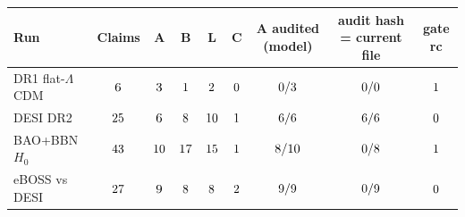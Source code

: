 \begin{tabular}{lcccccccc}
\toprule
Run & Claims & A & B & L & C & A audited (model) & audit hash = current file & gate rc \\
\midrule
DR1 flat-$\Lambda$CDM & $6$ & $3$ & $1$ & $2$ & $0$ & $0/3$ & $0/0$ & $1$ \\
DESI DR2 & $25$ & $6$ & $8$ & $10$ & $1$ & $6/6$ & $6/6$ & $0$ \\
BAO+BBN $H_0$ & $43$ & $10$ & $17$ & $15$ & $1$ & $8/10$ & $0/8$ & $1$ \\
eBOSS vs DESI & $27$ & $9$ & $8$ & $8$ & $2$ & $9/9$ & $0/9$ & $0$ \\
\bottomrule
\end{tabular}
